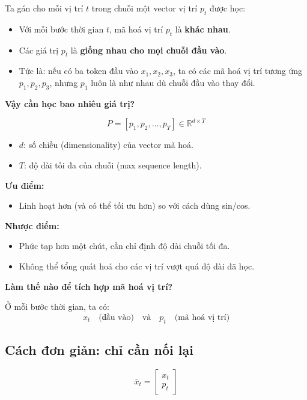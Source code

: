 \documentclass{book}
\begin{document}
    Ta gán cho mỗi vị trí $t$ trong chuỗi một vector vị trí $p_t$ được học:
    
    \begin{itemize}
        \item Với mỗi bước thời gian $t$, mã hoá vị trí $p_t$ là \textbf{khác nhau}.
        \item Các giá trị $p_t$ là \textbf{giống nhau cho mọi chuỗi đầu vào}.
        \item Tức là: nếu có ba token đầu vào $x_1, x_2, x_3$, ta có các mã hoá vị trí tương ứng $p_1, p_2, p_3$, nhưng $p_1$ luôn là như nhau dù chuỗi đầu vào thay đổi.
    \end{itemize}
    
    \textbf{Vậy cần học bao nhiêu giá trị?}
    
    \[
    P = [p_1, p_2, \ldots, p_T] \in \mathbb{R}^{d \times T}
    \]
    
    \begin{itemize}
        \item $d$: số chiều (dimensionality) của vector mã hoá.
        \item $T$: độ dài tối đa của chuỗi (max sequence length).
    \end{itemize}
    
    \vspace{1em}
    \textbf{Ưu điểm:}
    \begin{itemize}
        \item Linh hoạt hơn (và có thể tối ưu hơn) so với cách dùng sin/cos.
    \end{itemize}
    
    \textbf{Nhược điểm:}
    \begin{itemize}
        \item Phức tạp hơn một chút, cần chỉ định độ dài chuỗi tối đa.
        \item Không thể tổng quát hoá cho các vị trí vượt quá độ dài đã học.
    \end{itemize}
    \textbf{Làm thế nào để tích hợp mã hoá vị trí?}
    
    Ở mỗi bước thời gian, ta có:
    \[
    x_t \quad \text{(đầu vào)} \quad \text{và} \quad p_t \quad \text{(mã hoá vị trí)}
    \]
    
    \subsection*{Cách đơn giản: chỉ cần nối lại}
    \[
    \bar{x}_t = 
    \begin{bmatrix}
    x_t \\
    p_t
    \end{bmatrix}
    \]
    
\end{document}
